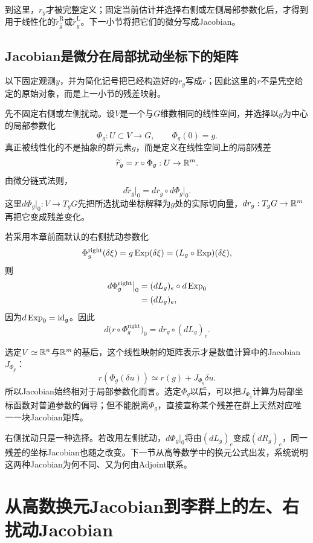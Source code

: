 到这里，$r_y$才被完整定义；固定当前估计并选择右侧或左侧局部参数化后，才得到用于线性化的$\widetilde r_{\hat g}^{\mathrm R}$或$\widetilde r_{\hat g}^{\mathrm L}$。下一小节将把它们的微分写成Jacobian。

\subsection{Jacobian是微分在局部扰动坐标下的矩阵}

以下固定观测$y$，并为简化记号把已经构造好的$r_y$写成$r$；因此这里的$r$不是凭空给定的原始对象，而是上一小节的残差映射。

先不固定右侧或左侧扰动。设$V$是一个与$G$维数相同的线性空间，并选择以$g$为中心的局部参数化
\[
    \Phi_g:U\subset V\to G,
    \qquad
    \Phi_g(0)=g.
\]
真正被线性化的不是抽象的群元素$g$，而是定义在线性空间上的局部残差
\[
    \widetilde r_g=r\circ\Phi_g:U\to\mathbb{R}^m.
\]
由微分链式法则，
\[
    \boxed{
    d\widetilde r_g\big|_0
    =dr_g\circ d\Phi_g\big|_0.
    }
\]
这里$d\Phi_g|_0:V\to T_gG$先把所选扰动坐标解释为$g$处的实际切向量，$dr_g:T_gG\to\mathbb{R}^m$再把它变成残差变化。

若采用本章前面默认的右侧扰动参数化
\[
    \Phi_g^{\mathrm{right}}(\delta\xi)
    =g\operatorname{Exp}(\delta\xi)
    =(L_g\circ\operatorname{Exp})(\delta\xi),
\]
则
\[
\begin{aligned}
    d\Phi_g^{\mathrm{right}}\big|_0
    &=(dL_g)_e\circ d\operatorname{Exp}_0\\
    &=(dL_g)_e,
\end{aligned}
\]
因为$d\operatorname{Exp}_0=\operatorname{id}_{\mathfrak g}$。因此
\[
    \boxed{
    d\bigl(r\circ\Phi_g^{\mathrm{right}}\bigr)_0
    =dr_g\circ(dL_g)_e.
    }
\]

选定$V\simeq\mathbb{R}^n$与$\mathbb{R}^m$的基后，这个线性映射的矩阵表示才是数值计算中的Jacobian$J_{\Phi_g}$：
\[
    r(\Phi_g(\delta u))
    \simeq
    r(g)+J_{\Phi_g}\delta u.
\]
所以Jacobian始终相对于局部参数化而言。选定$\Phi_g$以后，可以把$J_{\Phi_g}$计算为局部坐标函数对普通参数的偏导；但不能脱离$\Phi_g$，直接宣称某个残差在群上天然对应唯一一块Jacobian矩阵。

右侧扰动只是一种选择。若改用左侧扰动，$d\Phi_g|_0$将由$(dL_g)_e$变成$(dR_g)_e$，同一残差的坐标Jacobian也随之改变。下一节从高等数学中的换元公式出发，系统说明这两种Jacobian为何不同、又为何由Adjoint联系。


\section{从高数换元Jacobian到李群上的左、右扰动Jacobian}

